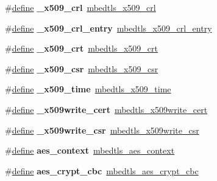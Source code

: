 \begin{DoxyCompactItemize}
\#\hyperlink{structdefine}{define} {\bfseries \+\_\+x509\+\_\+crl}~\hyperlink{structmbedtls__x509__crl}{mbedtls\+\_\+x509\+\_\+crl}
\item 
\mbox{\label{compat-1_83_8h_a7b3ba2f7e216aea4131a35179bf10254}} 
\#\hyperlink{structdefine}{define} {\bfseries \+\_\+x509\+\_\+crl\+\_\+entry}~\hyperlink{structmbedtls__x509__crl__entry}{mbedtls\+\_\+x509\+\_\+crl\+\_\+entry}
\item 
\mbox{\label{compat-1_83_8h_a0bfab43fdb4c0777fcbf5bae9d80b3f1}} 
\#\hyperlink{structdefine}{define} {\bfseries \+\_\+x509\+\_\+crt}~\hyperlink{structmbedtls__x509__crt}{mbedtls\+\_\+x509\+\_\+crt}
\item 
\mbox{\label{compat-1_83_8h_a488d75c86f0ed052aad6cbfebd6b2972}} 
\#\hyperlink{structdefine}{define} {\bfseries \+\_\+x509\+\_\+csr}~\hyperlink{structmbedtls__x509__csr}{mbedtls\+\_\+x509\+\_\+csr}
\item 
\mbox{\label{compat-1_83_8h_a3f9cfef42ae0c24349308f75cbecb5bc}} 
\#\hyperlink{structdefine}{define} {\bfseries \+\_\+x509\+\_\+time}~\hyperlink{structmbedtls__x509__time}{mbedtls\+\_\+x509\+\_\+time}
\item 
\mbox{\label{compat-1_83_8h_ae15621c3d36107c32232a97ffeeffd80}} 
\#\hyperlink{structdefine}{define} {\bfseries \+\_\+x509write\+\_\+cert}~\hyperlink{structmbedtls__x509write__cert}{mbedtls\+\_\+x509write\+\_\+cert}
\item 
\mbox{\label{compat-1_83_8h_a17fc9e191bc42766864afe54b5b4c77a}} 
\#\hyperlink{structdefine}{define} {\bfseries \+\_\+x509write\+\_\+csr}~\hyperlink{structmbedtls__x509write__csr}{mbedtls\+\_\+x509write\+\_\+csr}
\item 
\mbox{\label{compat-1_83_8h_a8c4a6a2694a922cf58586e145ed5d0d0}} 
\#\hyperlink{structdefine}{define} {\bfseries aes\+\_\+context}~\hyperlink{structmbedtls__aes__context}{mbedtls\+\_\+aes\+\_\+context}
\item 
\mbox{\label{compat-1_83_8h_a8ef8a86792155968ca85f296800d33ac}} 
\#\hyperlink{structdefine}{define} {\bfseries aes\+\_\+crypt\+\_\+cbc}~\hyperlink{aes_8h_a321834eafbf0dacb36dac343bfd6b35d}{mbedtls\+\_\+aes\+\_\+crypt\+\_\+cbc}

\end{DoxyCompactItemize}

